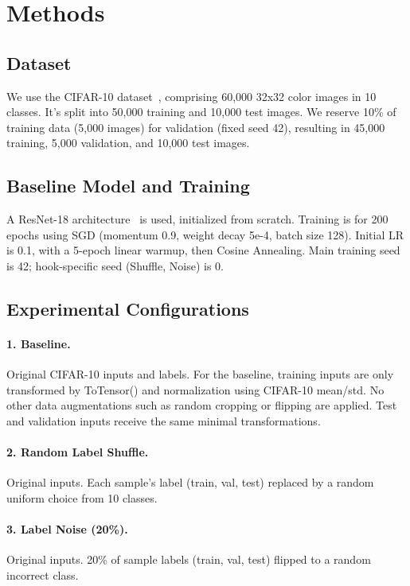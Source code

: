 \documentclass[10pt,twocolumn,letterpaper]{article}
\begin{document}
\section{Methods}
\label{sec:methods}

\subsection{Dataset}
We use the CIFAR-10 dataset~\cite{krizhevsky2009learning}, comprising 60,000 32x32 color images in 10 classes. It's split into 50,000 training and 10,000 test images. We reserve 10\% of training data (5,000 images) for validation (fixed seed 42), resulting in 45,000 training, 5,000 validation, and 10,000 test images.

\subsection{Baseline Model and Training}
A ResNet-18 architecture~\cite{DBLP:conf/cvpr/HeZRS16} is used, initialized from scratch.
Training is for 200 epochs using SGD (momentum 0.9, weight decay 5e-4, batch size 128). Initial LR is 0.1, with a 5-epoch linear warmup, then Cosine Annealing.
Main training seed is 42; hook-specific seed (Shuffle, Noise) is 0.

\subsection{Experimental Configurations}

\paragraph{1. Baseline.}
Original CIFAR-10 inputs and labels. For the baseline, training inputs are only transformed by ToTensor() and normalization using CIFAR-10 mean/std. No other data augmentations such as random cropping or flipping are applied. Test and validation inputs receive the same minimal transformations.

\paragraph{2. Random Label Shuffle.}
Original inputs. Each sample's label (train, val, test) replaced by a random uniform choice from 10 classes.

\paragraph{3. Label Noise (20\%).}
Original inputs. 20\% of sample labels (train, val, test) flipped to a random incorrect class.
\end{document}
